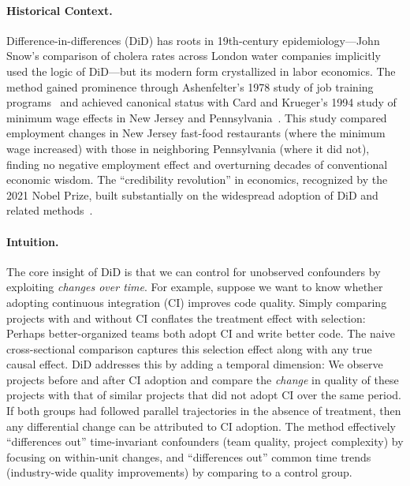 \paragraph{Historical Context.}
Difference-in-differences (DiD) has roots in 19th-century epidemiology---John Snow's comparison of cholera rates across London water companies implicitly used the logic of DiD---but its modern form crystallized in labor economics.
The method gained prominence through Ashenfelter's 1978 study of job training programs~\cite{ashenfelter1978estimating} and achieved canonical status with Card and Krueger's 1994 study of minimum wage effects in New Jersey and Pennsylvania~\cite{card1993minimum}.
This study compared employment changes in New Jersey fast-food restaurants (where the minimum wage increased) with those in neighboring Pennsylvania (where it did not), finding no negative employment effect and overturning decades of conventional economic wisdom.
The ``credibility revolution'' in economics, recognized by the 2021 Nobel Prize, built substantially on the widespread adoption of DiD and related methods~\cite{cunningham2021causal}.

\paragraph{Intuition.}
The core insight of DiD is that we can control for unobserved confounders by exploiting \emph{changes over time}.
For example, suppose we want to know whether adopting continuous integration (CI) improves code quality.
Simply comparing projects with and without CI conflates the treatment effect with selection: Perhaps better-organized teams both adopt CI and write better code.
The naive cross-sectional comparison captures this selection effect along with any true causal effect. 
DiD addresses this by adding a temporal dimension: We observe projects before and after CI adoption and compare the \emph{change} in quality of these projects with that of similar projects that did not adopt CI over the same period.
If both groups had followed parallel trajectories in the absence of treatment, then any differential change can be attributed to CI adoption.
The method effectively ``differences out'' time-invariant confounders (team quality, project complexity) by focusing on within-unit changes, and ``differences out'' common time trends (industry-wide quality improvements) by comparing to a control group.

